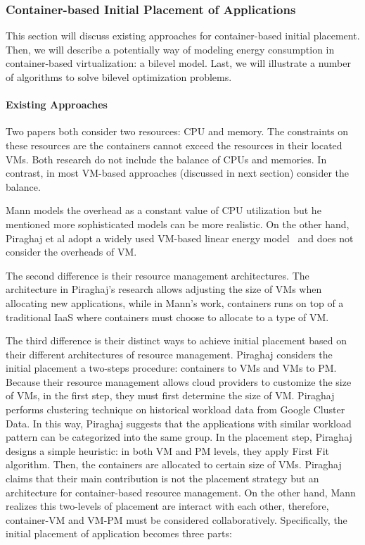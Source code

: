 \subsubsection{Container-based Initial Placement of Applications}
\label{container-based-placement}
This section will discuss existing approaches for container-based initial placement. Then, we will describe a potentially way of modeling energy consumption in container-based virtualization: a bilevel model. Last, we will illustrate a number of algorithms to solve bilevel optimization problems. 


\paragraph{Existing Approaches}

 Two papers both consider two resources: CPU and memory. The constraints on these resources are the containers cannot exceed the resources in their located VMs. Both research do not include the balance of CPUs and memories. In contrast, in most VM-based approaches (discussed in next section) consider the balance.

 Mann models the overhead as a constant value of CPU utilization but he mentioned more sophisticated models can be more realistic. On the other hand, Piraghaj et al \cite{Piraghaj:2016bw} adopt a widely used VM-based linear energy model~\cite{Xavier:2017jl} and does not consider the overheads of VM. 

The second difference is their resource management architectures. The architecture in Piraghaj's research allows adjusting 
the size of VMs when allocating new applications, while in Mann's work, containers runs on top of a traditional IaaS where containers must choose to allocate to a type of VM. 

The third difference is their distinct ways to achieve initial placement based on their different architectures of resource management. Piraghaj considers the initial placement a two-steps procedure: containers to VMs and VMs to PM. Because their resource management allows cloud providers to customize the size of VMs, in the first step, they must first determine the size of VM. Piraghaj performs clustering technique on historical workload data from Google Cluster Data. In this way, Piraghaj suggests that the applications with similar workload pattern can be categorized into the same group. In the placement step, Piraghaj designs a simple heuristic: in both VM and PM levels, they apply First Fit algorithm. Then, the containers are allocated to certain size of VMs. Piraghaj claims that their main contribution is not the placement strategy but an architecture for container-based resource management. On the other hand, Mann realizes this two-levels of placement are interact with each other, therefore, container-VM and VM-PM must be considered collaboratively. Specifically, the initial placement of application becomes three parts: 


